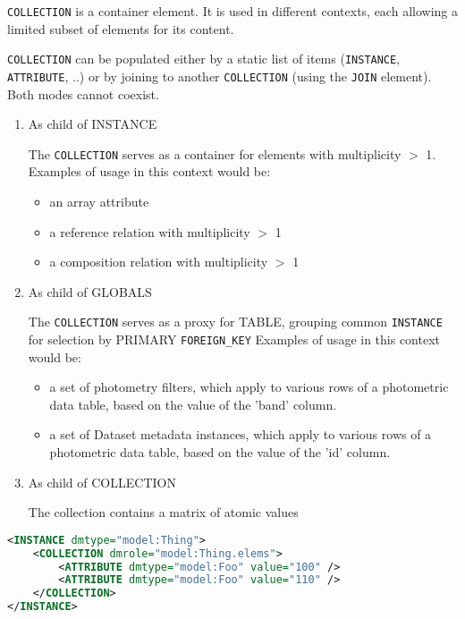     \texttt{COLLECTION} is a container element.  It is used in different contexts, each allowing a limited subset of elements for its content. 
    
    \texttt{COLLECTION} can be populated either by a static list of items (\texttt{INSTANCE}, \texttt{ATTRIBUTE}, ..) or by joining to another \texttt{COLLECTION} (using the \texttt{JOIN} element). Both  modes cannot coexist.
    
    \begin{enumerate}
    \item{As child of INSTANCE}
      
      The \texttt{COLLECTION} serves as a container for elements with multiplicity $>$ 1.\\
      Examples of usage in this context would be:
      \begin{itemize}
        \item an array attribute
        \item a reference relation with multiplicity $>$ 1
        \item a composition relation with multiplicity $>$ 1
      \end{itemize}
      
    \item{As child of GLOBALS}
          
      The \texttt{COLLECTION} serves as a proxy for TABLE, grouping common \texttt{INSTANCE}  for selection by PRIMARY \texttt{FOREIGN\_KEY} 
      Examples of usage in this context would be:
      \begin{itemize}
        \item a set of photometry filters, which apply to various rows of a photometric data table, based on the value of the 'band' column.
        \item a set of Dataset metadata instances, which apply to various rows of a photometric data table, based on the value of the 'id' column.
      \end{itemize}
          
    \item{As child of COLLECTION}
    
	The collection contains a matrix of  atomic values
        
    \end{enumerate}
   
\begin{lstlisting}[caption={Example of \texttt{COLLECTION} child of INSTANCE},language=XML]
<INSTANCE dmtype="model:Thing">
    <COLLECTION dmrole="model:Thing.elems">
        <ATTRIBUTE dmtype="model:Foo" value="100" />
        <ATTRIBUTE dmtype="model:Foo" value="110" />
    </COLLECTION>
</INSTANCE>
\end{lstlisting}   

